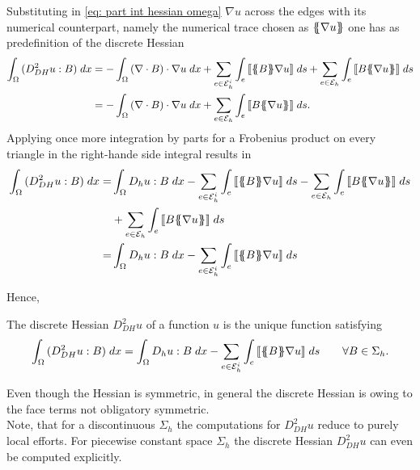 Substituting in \eqref{eq: part int hessian omega} $\nabla u$ across the edges with its numerical counterpart, namely the numerical trace chosen as $\{\!\!\{ \nabla u \}\!\!\}$ one has as predefinition of the discrete Hessian
	\begin{align}
		\myIntX  \Omega { (D_{DH}^2 u : B) }
		&= - \myIntX  \Omega { \left(\nabla \cdot B\right) \cdot \nabla u}
		+ \sum_{ e \in \edgesi} \myIntS e {  \jump {\average B \nabla u } }
				+ \sum_{ e \in \edges} \myIntS e { \jump {B \average {\nabla u} }}  \nonumber \\
		&= - \myIntX  \Omega { \left(\nabla \cdot B\right) \cdot \nabla u}
				+ \sum_{ e \in \edges} \myIntS e {  \jump{B \average {\nabla u} }}.	
	\end{align}
Applying once more integration by parts for a Frobenius product on every triangle in the right-hande side integral results in
	\begin{align}
		\myIntX  \Omega { (D_{DH}^2 u : B) }
		=& \myIntX  \Omega { D_h u: B }
			-\sum_{ e \in \edgesi} \myIntS e {  \jump {\average B  \nabla u }}
			- \sum_{ e \in \edges} \myIntS e { \jump {B \average {\nabla u} }}\nonumber \\		
			&+ \sum_{ e \in \edges} \myIntS e {  \jump {B \average {\nabla u} }}		\nonumber \\
		=& \myIntX  \Omega { D_h u: B}
			 -\sum_{ e \in \edgesi} \myIntS e {  \jump {\average B  \nabla u }	}
	\end{align}

Hence,
\begin{definition} \label{def: discrete Hessian}
	The discrete Hessian $D_{DH}^2 u$ of a function $u$ is the unique function satisfying
	\begin{align}
		\int_{\Omega} {{ (D_{DH}^2 u : B) }\;dx}
		= \int_{\Omega} {{ D_h u: B}\;dx}
			 -\sum_{ e \in \mathcal{E}_h^i} \int_{e} {{  \llbracket \{\!\!\{ B \}\!\!\} \nabla u  \rrbracket}\;ds}\qquad \forall B \in \Sigma_h. \label{eq: discrete hessian}
	\end{align}
\end{definition}

Even though the Hessian is symmetric, in general the discrete Hessian is owing to the face terms not obligatory symmetric. \\
Note, that for a discontinuous $\Sigma_h$ the computations for $D_{DH}^2 u$ reduce to purely local efforts. For piecewise constant space $\Sigma_h$ the discrete Hessian $D_{DH}^2 u$ can even be computed explicitly.

